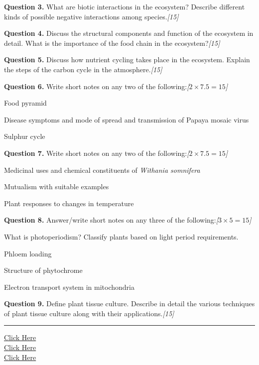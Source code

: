 \documentclass[11pt,a4paper]{article}
\newcommand{\pts}[1]{\hfill   \textit{[#1]}}
\begin{document}
\medskip


\noindent   \textbf{Question 3.} What are biotic interactions in the ecosystem? Describe different kinds of possible negative interactions among species.\pts{15}

\medskip


\noindent   \textbf{Question 4.} Discuss the structural components and function of the ecosystem in detail. What is the importance of the food chain in the ecosystem?\pts{15}

\medskip


\noindent   \textbf{Question 5.} Discuss how nutrient cycling takes place in the ecosystem. Explain the steps of the carbon cycle in the atmosphere.\pts{15}

\medskip


\noindent   \textbf{Question 6.} Write short notes on any two of the following:\pts{$2  \times 7.5 = 15$}

\begin{parts}
  \item Food pyramid
  \item Disease symptoms and mode of spread and transmission of Papaya mosaic virus
  \item Sulphur cycle
\end{parts}

\medskip


\noindent   \textbf{Question 7.} Write short notes on any two of the following:\pts{$2  \times 7.5 = 15$}

\begin{parts}
  \item Medicinal uses and chemical constituents of   \textit{Withania somnifera}
  \item Mutualism with suitable examples
  \item Plant responses to changes in temperature
\end{parts}

\medskip


\noindent   \textbf{Question 8.} Answer/write short notes on any three of the following:\pts{$3  \times 5 = 15$}

\begin{parts}
  \item What is photoperiodism? Classify plants based on light period requirements.
  \item Phloem loading
  \item Structure of phytochrome
  \item Electron transport system in mitochondria
\end{parts}

\medskip


\noindent   \textbf{Question 9.} Define plant tissue culture. Describe in detail the various techniques of plant tissue culture along with their applications.\pts{15}

\vfill
\rule{\linewidth}{0.4pt}

\begin{center}\small
\href{https://bhu-exam.vercel.app/}{Click Here}\\[4pt]\href{https://me-aryan.vercel.app/}{Click Here}\\[4pt]\href{https://quashan-me.vercel.app/}{Click Here}
\end{center}
\end{document}
